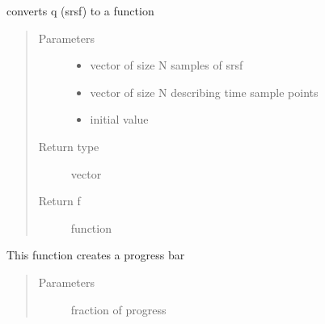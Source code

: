 \documentclass[letterpaper,10pt,english]{sphinxmanual}
\begin{document}
\begin{fulllineitems}
\label{\detokenize{utility_functions:utility_functions.srsf_to_f}}
converts q (srsf) to a function
\begin{quote}\begin{description}
\item[{Parameters}] \leavevmode\begin{itemize}
\item {} 
 \textendash{} vector of size N samples of srsf

\item {} 
 \textendash{} vector of size N describing time sample points

\item {} 
 \textendash{} initial value

\end{itemize}

\item[{Return type}] \leavevmode
vector

\item[{Return f}] \leavevmode
function

\end{description}\end{quote}

\end{fulllineitems}


\begin{fulllineitems}
\label{\detokenize{utility_functions:utility_functions.update_progress}}
This function creates a progress bar
\begin{quote}\begin{description}
\item[{Parameters}] \leavevmode
{} \textendash{} fraction of progress

\end{description}\end{quote}

\end{fulllineitems}
\end{document}
